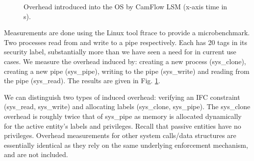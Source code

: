 \documentclass[10pt,journal,compsoc]{IEEEtran}
\begin{document}
\begin{figure}[t]
\centering
{}
  \caption{
  Overhead introduced into the OS by CamFlow LSM (x-axis time in s).
    }
  \label{image:os:eval}
\end{figure}

Measurements are done using the Linux tool \textsf{\small ftrace} \cite{bird2009measuring} to provide a microbenchmark. 
Two processes read from and write to a pipe respectively. Each has 20 tags in its security label, substantially more than we have seen a need for in current use cases. We measure the overhead induced by: 
creating a new process (\textsf{\small sys\_clone}), creating a new pipe (\textsf{\small sys\_pipe}), writing to the pipe (\textsf{\small sys\_write}) and reading from the pipe (\textsf{\small sys\_read}). The results are given in Fig. \ref{image:os:eval}.

We can distinguish two types of induced overhead: verifying an IFC constraint (\textsf{\small sys\_read}, \textsf{\small sys\_write}) and allocating labels (\textsf{\small sys\_clone}, \textsf{\small sys\_pipe}).
The \textsf{\small sys\_clone} overhead is roughly twice that of \textsf{\small sys\_pipe} as memory is allocated dynamically for the active entity's labels and privileges. Recall that passive entities have no privileges.  
Overhead measurements for other system calls/data structures 
are essentially identical as they rely on the same underlying enforcement mechanism, and are not included. 
\end{document}
